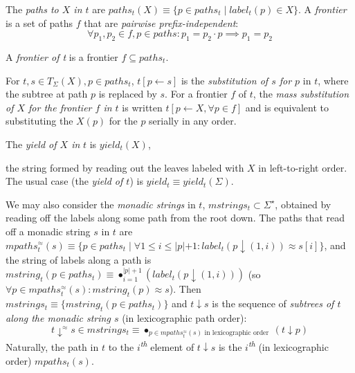 \documentclass[english]{article}
\newcommand\geneq{{\approx}}
\newcommand\comment[1]{}
\newcommand\logand{\wedge}
\newcommand\logor{\vee}
\newcommand\concat{\cdot}
\newcommand\bigconcat{\bullet}
\newcommand\assign{\leftarrow}
\newcommand\logimplies{\implies} %
\newcommand\st{\;|\;}
\newcommand{\nth}[2]{#1\textsuperscript{\textit{#2}}}
\newcommand{\kstar}{^{\star}}
\begin{document}
The \emph{paths to $X$ in $t$} are $paths_{t}(X)\equiv\{ p\in{paths_{t}}\st label_{t}(p)\in{X}\}$.
A \emph{frontier} is a set of paths $f$ that are \emph{pairwise
  prefix-independent}:
\[
\forall p_{1},p_{2}\in{f},p\in{paths}:p_{1}=p_{2}\concat p\logimplies
p_{1}=p_{2}\]


A \emph{frontier of t} is a frontier $f\subseteq paths_{t}$.

For $t,s\in{T_{\Sigma}(X)},p\in{paths_{t}}$, $t[p\assign s]$ is the
\emph{substitution of $s$ for $p$} in $t$, where the subtree at path $p$ is
replaced by $s$. For a frontier $f$ of $t$, the \emph{mass substitution of $X$
  for the frontier $f$ in $t$} is written $t[p\assign X,\forall p\in{f}]$ and
is equivalent to substituting the $X(p)$ for the $p$ serially in any order.

The \emph{yield of $X$ in} $t$ is $yield_{t}(X)$,
\comment{
  the concatenation (in lexicographic order\footnote{$()<_{lex}(a)$, $(a_{1})<_{lex}(a_{2}) \textrm{ iff } a_{1}<a_{2}$,  $(a_{1}) \cdot b_{1}<_{lex} (a_{2})\cdot b_{2} \textrm{ iff } a_{1}<a_{2} \logor (a_{1}=a_{2} \logand b_{1}<_{lex} b_{2})$}) over paths
  to leaves $l\in{paths_{t}}$ (such that $rank_{t}(l)=0$) of
  $label_{t}(l)\in{X}$---that is,
}
the string formed by reading out the leaves
labeled with $X$ in left-to-right order.
The usual case (the \emph{yield of
  $t$}) is $yield_{t}\equiv yield_{t}(\Sigma)$.

We may also consider the \emph{monadic strings} in $t$, $mstrings_t \subset \Sigma\kstar$, obtained by reading off the
labels along some path from the root down.
The paths that read off a monadic string $s$ in $t$ are $mpaths_{t}^{\geneq}(s)\equiv \{p\in
paths_t\st \forall 1\leq i \leq |p|+1 : label_t(p\downarrow (1,i))\geneq s[i]\}$, and the string of labels along a path is
$mstring_t(p\in paths_t)\equiv \bigconcat_{i=1}^{|p|+1} (label_t(p\downarrow
(1,i)))$ (so $\forall p\in mpaths_t^{\geneq}(s) : mstring_t(p)\geneq s$).  Then $mstrings_t \equiv \{mstring_t(p\in paths_t)\}$ and
$t\downarrow s$ is the sequence of \emph{subtrees of $t$ along the monadic
  string $s$} (in lexicographic path order):
\[
t\downarrow^{\geneq} s\in{mstrings_t} \equiv \bigconcat_{p\in mpaths_{t}^{\geneq}(s) \text{ in
    lexicographic order }} (t\downarrow p)
\]
Naturally, the path in $t$ to the \nth{$i$}{th} element of $t \downarrow s$ is
the \nth{$i$}{th} (in lexicographic order) $mpaths_t(s)$.
\end{document}
